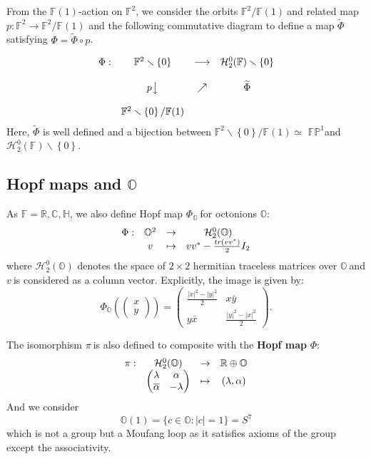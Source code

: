 \documentclass[a4paper]{article}%
\begin{document}
From the $\mathbb{F}(1)$-action on $\mathbb{F}^{2}$, we consider the orbits
$\mathbb{F}^{2}/\mathbb{F}(1)\ $and related map $p:\mathbb{F}^{2}%
\rightarrow\mathbb{F}^{2}/\mathbb{F}(1)$ and the following commutative diagram
to define a map $\widetilde{\Phi}$ satisfying $\Phi=\widetilde{\Phi}\circ p$.%

\[%
\begin{matrix}
\Phi: & \mathbb{F}^{2}\smallsetminus\left\{  0\right\}  & \longrightarrow &
\mathcal{H}_{2}^{0}(\mathbb{F})\smallsetminus\left\{  0\right\} \\
&  &  & \\
& p\big\downarrow & \nearrow & \widetilde{\Phi}\\
&  &  & \\
& \mathbb{F}^{2}\smallsetminus\left\{  0\right\}  /\mathbb{F}(1) &  &
\end{matrix}
\]
Here, $\widetilde{\Phi}$ is well defined and a bijection between
$\mathbb{F}^{2}\smallsetminus\left\{  0\right\}  /\mathbb{F}(1)\simeq$
$\mathbb{FP}^{1}$and $\mathcal{H}_{2}^{0}(\mathbb{F})\smallsetminus\left\{
0\right\}  $.

\subsection{Hopf maps and $\mathbb{O}$}

As $\mathbb{F}=\mathbb{R},\mathbb{C},\mathbb{H}$, we also define Hopf map
$\Phi_{\mathbb{O}}\ $for octonions $\mathbb{O}$:%
\[%
\begin{array}
[c]{cccc}%
\Phi: & \mathbb{O}^{2} & \rightarrow & \mathcal{H}_{2}^{0}(\mathbb{O})\\
& v & \mapsto & vv^{\ast}-\frac{tr(vv^{\ast})}{2}I_{2}%
\end{array}
\]
where $\mathcal{H}_{2}^{0}(\mathbb{O})$ denotes the space of $2\times2$
hermitian traceless matrices over $\mathbb{O\ }$and $v\ $is considered as a
column vector. Explicitly, the image is given by:
\[
\Phi_{\mathbb{O}}\left(
\begin{pmatrix}
x\\
y
\end{pmatrix}
\right)  =%
\begin{pmatrix}
\frac{|x|^{2}-|y|^{2}}{2} & x\bar{y}\\
y\bar{x} & \frac{|y|^{2}-|x|^{2}}{2}%
\end{pmatrix}
.
\]


The isomorphism $\pi\ $is also defined to composite with the \textbf{Hopf map
}$\Phi:$
\[%
\begin{array}
[c]{cccc}%
\pi: & \mathcal{H}_{2}^{0}(\mathbb{O}) & \rightarrow & \mathbb{R}%
\oplus\mathbb{O}\\
&
\begin{pmatrix}
\lambda & \alpha\\
\overline{\alpha} & -\lambda
\end{pmatrix}
& \mapsto & (\lambda,\alpha)
\end{array}
\]
And we consider
\[
\mathbb{O}(1)=\{c\in\mathbb{O}:|c|=1\}=S^{7}%
\]
which is not a group but a Moufang loop as it satisfies axioms of the group
except the associativity.
\end{document}

